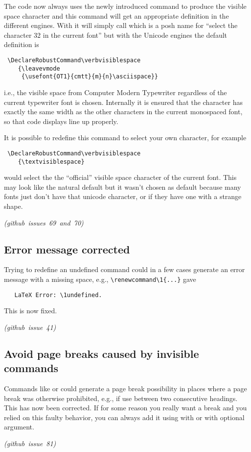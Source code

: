 \documentclass{ltnews}
\providecommand\pdfTeX{\hologo{pdfTeX}}
\newcommand\githubissue[2][]{\ifhmode\unskip\fi
     \quad\penalty500\strut\nobreak\hfill
     \mbox{\small\itshape(github issue#1 #2)}\par}
\begin{document}
The  code now always uses the newly introduced command
 to produce the visible space character and this
command will get an appropriate definition in the different
engines. With \pdfTeX{} it will simply call  which is a
posh name for ``select the character 32 in the current font'' but with
the Unicode engines the default definition is
\begin{verbatim}
 \DeclareRobustCommand\verbvisiblespace
    {\leavevmode
     {\usefont{OT1}{cmtt}{m}{n}\asciispace}}
\end{verbatim}
i.e., the visible space from Computer Modern Typewriter regardless of
the current typewriter font is chosen.  Internally it is ensured that
the character has exactly the same width as the other characters in
the current monospaced font, so that code displays line up properly.

It is possible to redefine this command to select your own character,
for example
\begin{verbatim}
 \DeclareRobustCommand\verbvisiblespace
    {\textvisiblespace}
\end{verbatim}
would select the the ``official'' visible space character of the
current font. This may look like the natural default but it wasn't
chosen as default because many fonts just don't have that unicode
character, or if they have one with a strange shape.
%
\githubissue[s]{69 and 70}

        
\subsection{Error message corrected}
Trying to redefine an undefined command could in a few cases generate
an error message with a missing space, e.g.,
\verb=\renewcommand\1{...}= gave
\begin{verbatim}
   LaTeX Error: \1undefined.
\end{verbatim}
This is now fixed.
%
\githubissue{41}


\subsection{Avoid page breaks caused by invisible commands}

Commands like  or  could generate a page break
possibility in places where a page break was otherwise prohibited,
e.g., if use between two consecutive headings. This has now been
corrected. If for some reason you really want a break and you relied
on this faulty behavior, you can always add it using 
with or with optional argument.
%
\githubissue{81}
\end{document}

